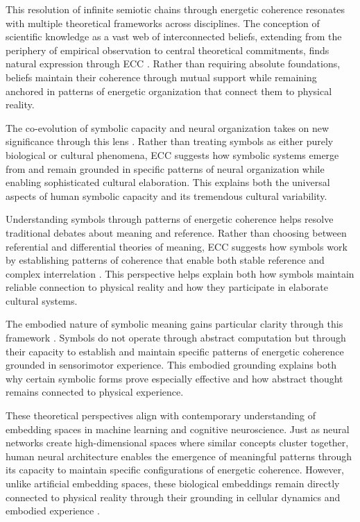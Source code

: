 This resolution of infinite semiotic chains through energetic coherence resonates with multiple theoretical frameworks across disciplines. The conception of scientific knowledge as a vast web of interconnected beliefs, extending from the periphery of empirical observation to central theoretical commitments, finds natural expression through ECC \cite{quine1960word}. Rather than requiring absolute foundations, beliefs maintain their coherence through mutual support while remaining anchored in patterns of energetic organization that connect them to physical reality.

The co-evolution of symbolic capacity and neural organization takes on new significance through this lens \cite{deacon1997symbolic}. Rather than treating symbols as either purely biological or cultural phenomena, ECC suggests how symbolic systems emerge from and remain grounded in specific patterns of neural organization while enabling sophisticated cultural elaboration. This explains both the universal aspects of human symbolic capacity and its tremendous cultural variability.

Understanding symbols through patterns of energetic coherence helps resolve traditional debates about meaning and reference. Rather than choosing between referential and differential theories of meaning, ECC suggests how symbols work by establishing patterns of coherence that enable both stable reference and complex interrelation \cite{searle1980minds}. This perspective helps explain both how symbols maintain reliable connection to physical reality and how they participate in elaborate cultural systems.

The embodied nature of symbolic meaning gains particular clarity through this framework \cite{hutchins1995cognition}. Symbols do not operate through abstract computation but through their capacity to establish and maintain specific patterns of energetic coherence grounded in sensorimotor experience. This embodied grounding explains both why certain symbolic forms prove especially effective and how abstract thought remains connected to physical experience.

These theoretical perspectives align with contemporary understanding of embedding spaces in machine learning and cognitive neuroscience. Just as neural networks create high-dimensional spaces where similar concepts cluster together, human neural architecture enables the emergence of meaningful patterns through its capacity to maintain specific configurations of energetic coherence. However, unlike artificial embedding spaces, these biological embeddings remain directly connected to physical reality through their grounding in cellular dynamics and embodied experience \cite{lakoff1999philosophy}.

